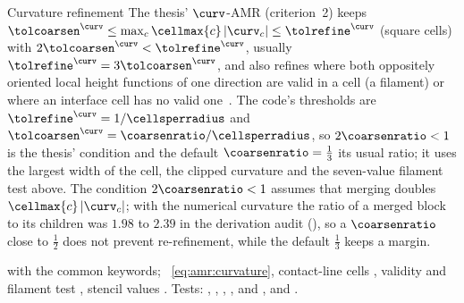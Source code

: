 \begin{deviation}{Curvature refinement}\label{dev:amr:curvature}
The thesis' $\curv$-AMR (criterion~2) keeps
$\tolcoarsen^{\curv}\le\max_{c}\cellmax{c}\abs{\curv_c}\le\tolrefine^{\curv}$ (square cells) with
$2\tolcoarsen^{\curv}<\tolrefine^{\curv}$, usually
$\tolrefine^{\curv}=3\tolcoarsen^{\curv}$, and also refines where both
oppositely oriented local height functions of one direction are valid in a
cell (a filament) or where an interface cell has no valid one~.
The code's thresholds are $\tolrefine^{\curv}=1/\cellsperradius$ and
$\tolcoarsen^{\curv}=\coarsenratio/\cellsperradius$, so $2\coarsenratio<1$ is
the thesis' condition and the default $\coarsenratio=\tfrac13$ its usual ratio;
it uses the largest width of the cell, the clipped curvature and the
seven-value filament test above. The condition $2\coarsenratio<1$ assumes that
merging doubles $\cellmax{c}\abs{\curv_c}$; with the numerical curvature the
ratio of a merged block to its children was $1.98$ to $2.39$ in the
derivation audit (), so a
$\coarsenratio$ close to $\tfrac12$ does not prevent re-refinement, while the
default $\tfrac13$ keeps a margin.
\end{deviation}

\begin{implnote}
with the common keywords; ~\cref{eq:amr:curvature},
contact-line cells ,
validity and filament test
, stencil
values . Tests:
,
,
,
, and
, and
.
\end{implnote}

